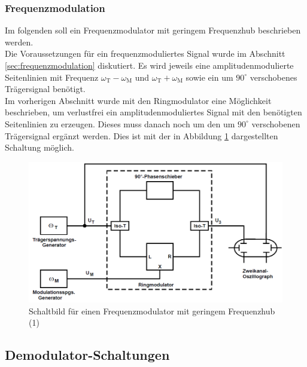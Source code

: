 \documentclass[]{scrartcl}
\begin{document}
\subsubsection*{Frequenzmodulation}
Im folgenden soll ein Frequenzmodulator mit geringem Frequenzhub beschrieben werden.\\
Die Voraussetzungen für ein frequenzmoduliertes Signal wurde im Abschnitt \ref{sec:frequenzmodulation} diskutiert. Es wird jeweils eine amplitudenmodulierte Seitenlinien mit Frequenz $\omega_{\text{T}}-\omega_{\text{M}}$ und $\omega_{\text{T}}+\omega_{\text{M}}$ sowie ein um $90^\circ$ verschobenes Trägersignal benötigt.\\
Im vorherigen Abschnitt wurde mit den Ringmodulator eine Möglichkeit beschrieben, um verlustfrei ein amplitudenmoduliertes Signal mit den benötigten Seitenlinien zu erzeugen. Dieses muss danach noch um den um $90^\circ$ verschobenen Trägersignal ergänzt werden. Dies ist mit der in Abbildung \ref{fig:frequenzmodulationsschaltung} dargestellten Schaltung möglich.
\begin{figure}[H]
\centering 
\includegraphics[width=13cm]{images/frequenzmodulationsschaltung.png}
\caption{Schaltbild für einen Frequenzmodulator mit geringem Frequenzhub (1)}
\label{fig:frequenzmodulationsschaltung}
\end{figure} 
\subsection{Demodulator-Schaltungen}
\end{document}
